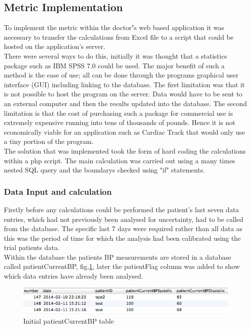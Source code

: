 \documentclass[11pt]{article}
\begin{document}
\subsection{Metric Implementation}
To implement the metric within the doctor"s web based application it was necessary to transfer the calculations from Excel file to a script that could be hosted on the application's server. 
\\ \indent There were several ways to do this, initially it was thought that a statistics package such as IBM SPSS 7.0 \cite{SPSS} could be used. The major benefit of such a method is the ease of use; all can be done through the programs graphical user interface (GUI) including linking to the database. The first limitation was that it is not possible to host the program on the server. Data would have to be sent to an external computer and then the results updated into the database. The second limitation is that the cost of purchasing such a package for commercial use is extremely expensive running into tens of thousands of pounds. Hence it is not economically viable for an application such as Cardiac Track that would only use a tiny portion of the program.
\\ \indent 
The solution that was implemented took the form of hard coding the calculations within a php script. The main calculation was carried out using a many times nested SQL query and the boundarys checked using "if" statements. 

\subsubsection{Data Input and calculation}
Firstly before any calculations could be performed the patient's last seven data entries, which had not previously been analysed for uncertainty, had to be called from the database. The specific last 7 days were required rather than all data as this was the period of time for which the analysis had been calibrated using the trial patients data.
\\ \indent 
Within the database the patients BP measurements are stored in a database called patientCurrentBP, fig.\ref{DB1}, later the patientFlag column was added to show which data entries have already been analysed.

\begin{figure}
\centering
\includegraphics[scale=0.4]{DB1.png}
\caption{Initial patientCurrentBP table \label{DB1}} 
\end{figure} 
\end{document}
